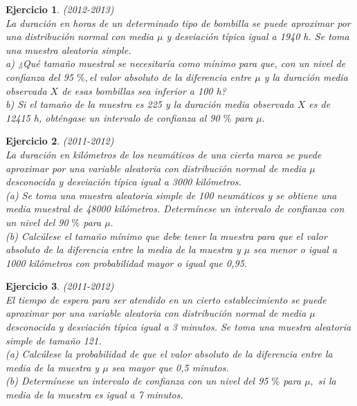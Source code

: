 \documentclass[12pt, a4paper]{amsart}
\newtheorem{ejer}{Ejercicio}
\begin{document}
\begin{ejer}\em (2012-2013)\\
La duración en horas de un determinado tipo de bombilla se puede aproximar por una distribución normal
con media $\mu$ y desviación típica igual a 1940 h. Se toma una muestra aleatoria simple.\\
a) ¿Qué tamaño muestral se necesitaría como mínimo para que, con un nivel de confianza del 95 $\%,$el valor
absoluto de la diferencia entre $\mu$ y la duración media observada $X$ de esas bombillas sea inferior a 100 h?\\
b) Si el tamaño de la muestra es 225 y la duración media observada $X$ es de 12415 h, obténgase un intervalo
de confianza al 90 $\%$ para $\mu.$
\end{ejer}

\begin{ejer}\em (2011-2012)\\
La duración en kilómetros de los neumáticos de una cierta marca se puede aproximar por una
variable aleatoria con distribución normal de media $\mu$ desconocida y desviación típica igual a
3000 kilómetros.\\
(a) Se toma una muestra aleatoria simple de 100 neumáticos y se obtiene una media muestral
de 48000 kilómetros. Determínese un intervalo de confianza con un nivel del 90 $\%$ para $\mu.$\\
(b) Calcúlese el tamaño mínimo que debe tener la muestra para que el valor absoluto de
la diferencia entre la media de la muestra y $\mu$ sea menor o igual a 1000 kilómetros con
probabilidad mayor o igual que 0,95.
\end{ejer}

\begin{ejer}\em (2011-2012)\\
El tiempo de espera para ser atendido en un cierto establecimiento se puede aproximar por una
variable aleatoria con distribución normal de media $\mu$ desconocida y desviación típica igual a 3
minutos. Se toma una muestra aleatoria simple de tamaño 121.\\
(a) Calcúlese la probabilidad de que el valor absoluto de la diferencia entre la media de la
muestra y $\mu$ sea mayor que 0,5 minutos.\\
(b) Determínese un intervalo de confianza con un nivel del 95 $\%$ para $\mu,$ si la media de la
muestra es igual a 7 minutos.
\end{ejer}
\end{document}

